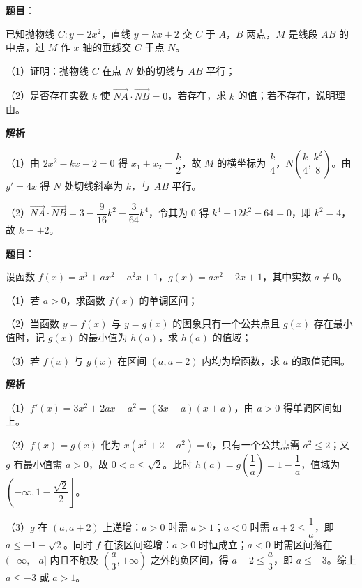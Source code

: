 \begin{answer}

\textbf{题目}：

已知抛物线 $C:y=2x^2$，直线 $y=kx+2$ 交 $C$ 于 $A$，$B$ 两点，$M$ 是线段 $AB$ 的中点，过 $M$ 作 $x$ 轴的垂线交 $C$ 于点 $N$。

（1）证明：抛物线 $C$ 在点 $N$ 处的切线与 $AB$ 平行；

（2）是否存在实数 $k$ 使 $\overrightarrow{NA}\cdot\overrightarrow{NB}=0$，若存在，求 $k$ 的值；若不存在，说明理由。

\textbf{解析}

（1）由 $2x^2-kx-2=0$ 得 $x_1+x_2=\dfrac k2$，故 $M$ 的横坐标为 $\dfrac k4$，$N\left(\dfrac k4,\dfrac{k^2}8\right)$。由 $y'=4x$ 得 $N$ 处切线斜率为 $k$，与 $AB$ 平行。

（2）$\overrightarrow{NA}\cdot\overrightarrow{NB}=3-\dfrac9{16}k^2-\dfrac3{64}k^4$，令其为 $0$ 得 $k^4+12k^2-64=0$，即 $k^2=4$，故 $k=\pm2$。


\end{answer}
\begin{answer}

\textbf{题目}：

设函数 $f(x)=x^3+ax^2-a^2x+1$，$g(x)=ax^2-2x+1$，其中实数 $a\neq0$。

（1）若 $a>0$，求函数 $f(x)$ 的单调区间；

（2）当函数 $y=f(x)$ 与 $y=g(x)$ 的图象只有一个公共点且 $g(x)$ 存在最小值时，记 $g(x)$ 的最小值为 $h(a)$，求 $h(a)$ 的值域；

（3）若 $f(x)$ 与 $g(x)$ 在区间 $(a,a+2)$ 内均为增函数，求 $a$ 的取值范围。

\textbf{解析}

（1）$f'(x)=3x^2+2ax-a^2=(3x-a)(x+a)$，由 $a>0$ 得单调区间如上。

（2）$f(x)=g(x)$ 化为 $x(x^2+2-a^2)=0$，只有一个公共点需 $a^2\leqslant2$；又 $g$ 有最小值需 $a>0$，故 $0<a\leqslant\sqrt2$。此时 $h(a)=g\left(\dfrac1a\right)=1-\dfrac1a$，值域为 $\left(-\infty,1-\dfrac{\sqrt2}2\right]$。

（3）$g$ 在 $(a,a+2)$ 上递增：$a>0$ 时需 $a>1$；$a<0$ 时需 $a+2\leqslant\dfrac1a$，即 $a\leqslant-1-\sqrt2$。同时 $f$ 在该区间递增：$a>0$ 时恒成立；$a<0$ 时需区间落在 $(-\infty,-a]$ 内且不触及 $\left(\dfrac a3,+\infty\right)$ 之外的负区间，得 $a+2\leqslant\dfrac a3$，即 $a\leqslant-3$。综上 $a\leqslant-3$ 或 $a>1$。

\gkanswer{答案：（1）增 $(-\infty,-a)$、$\left(\dfrac a3,+\infty\right)$，减 $\left(-a,\dfrac a3\right)$；（2）$\left(-\infty,1-\dfrac{\sqrt2}2\right]$；（3）$a\leqslant-3$ 或 $a>1$。}

\end{answer}